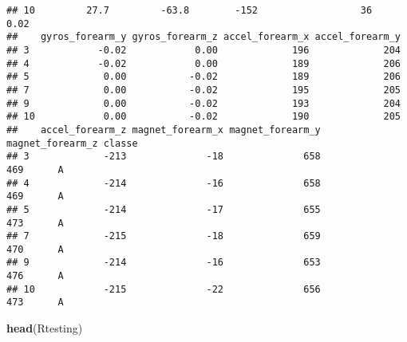 \documentclass[]{article}
\newenvironment{Shaded}{\begin{snugshade}}{\end{snugshade}}
\newcommand{\KeywordTok}[1]{\textcolor[rgb]{0.13,0.29,0.53}{\textbf{#1}}}
\newcommand{\NormalTok}[1]{#1}
\begin{document}
\begin{verbatim}
## 10         27.7         -63.8        -152                  36            0.02
##    gyros_forearm_y gyros_forearm_z accel_forearm_x accel_forearm_y
## 3            -0.02            0.00             196             204
## 4            -0.02            0.00             189             206
## 5             0.00           -0.02             189             206
## 7             0.00           -0.02             195             205
## 9             0.00           -0.02             193             204
## 10            0.00           -0.02             190             205
##    accel_forearm_z magnet_forearm_x magnet_forearm_y magnet_forearm_z classe
## 3             -213              -18              658              469      A
## 4             -214              -16              658              469      A
## 5             -214              -17              655              473      A
## 7             -215              -18              659              470      A
## 9             -214              -16              653              476      A
## 10            -215              -22              656              473      A
\end{verbatim}

\begin{Shaded}
\begin{Highlighting}[]
\KeywordTok{head}\NormalTok{(Rtesting)}
\end{Highlighting}
\end{Shaded}
\end{document}
